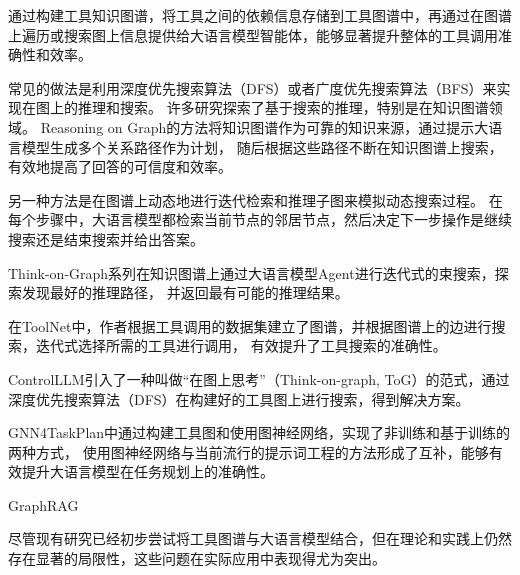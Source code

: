 通过构建工具知识图谱，将工具之间的依赖信息存储到工具图谱中，再通过在图谱上遍历或搜索图上信息提供给大语言模型智能体，能够显著提升整体的工具调用准确性和效率。

常见的做法是利用深度优先搜索算法（DFS）或者广度优先搜索算法（BFS）来实现在图上的推理和搜索。
许多研究探索了基于搜索的推理，特别是在知识图谱领域。
Reasoning on Graph\cite{Luo2023}的方法将知识图谱作为可靠的知识来源，通过提示大语言模型生成多个关系路径作为计划，
随后根据这些路径不断在知识图谱上搜索，有效地提高了回答的可信度和效率。

另一种方法是在图谱上动态地进行迭代检索和推理子图来模拟动态搜索过程\cite{Liu2024, Sun2023, Ma2024}。
在每个步骤中，大语言模型都检索当前节点的邻居节点，然后决定下一步操作是继续搜索还是结束搜索并给出答案。


Think-on-Graph系列\cite{Sun2023,Ma2024}在知识图谱上通过大语言模型Agent进行迭代式的束搜索，探索发现最好的推理路径，
并返回最有可能的推理结果。

在ToolNet\cite{Liu2024}中，作者根据工具调用的数据集建立了图谱，并根据图谱上的边进行搜索，迭代式选择所需的工具进行调用，
有效提升了工具搜索的准确性。

ControlLLM\cite{Liu2023a}引入了一种叫做“在图上思考”（Think-on-graph, ToG）的范式，通过深度优先搜索算法（DFS）在构建好的工具图上进行搜索，得到解决方案。

GNN4TaskPlan中\cite{wucan2024}通过构建工具图和使用图神经网络，实现了非训练和基于训练的两种方式，
使用图神经网络与当前流行的提示词工程的方法形成了互补，能够有效提升大语言模型在任务规划上的准确性。


GraphRAG\cite{}

尽管现有研究已经初步尝试将工具图谱与大语言模型结合，但在理论和实践上仍然存在显著的局限性，这些问题在实际应用中表现得尤为突出。

